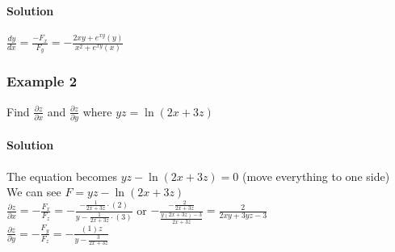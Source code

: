 \documentclass{article}
\newcommand{\p}{\partial}
\begin{document}
\paragraph{Solution} $\frac{dy}{dx}=\frac{-F_x}{F_y}=-\frac{2xy+e^{xy}(y)}{x^2+e^{xy}(x)}$

\subsubsection{Example 2} Find $\frac{\p z}{\p x}$ and $\frac{\p z}{\p y}$ where $yz=\ln(2x+3z)$
\paragraph{Solution} The equation becomes $yz-\ln(2x+3z)=0$ (move everything to one side)
\\We can see $F=yz-\ln(2x+3z)$
\\$\frac{\p z}{\p x}=-\frac{F_x}{F_z}=-\frac{-\frac{1}{2x+3z}\cdot(2)}{y-\frac{1}{2x+3z}\cdot(3)}$
or $-\frac{-\frac{2}{2x+3z}}{\frac{y(2x+3z)-3}{2x+3z}}=\frac{2}{2xy+3yz-3}$
\\$\frac{\p z}{\p y}=-\frac{F_y}{F_z}=-\frac{(1)z}{y-\frac{3}{2x+3z}}$
\end{document}
